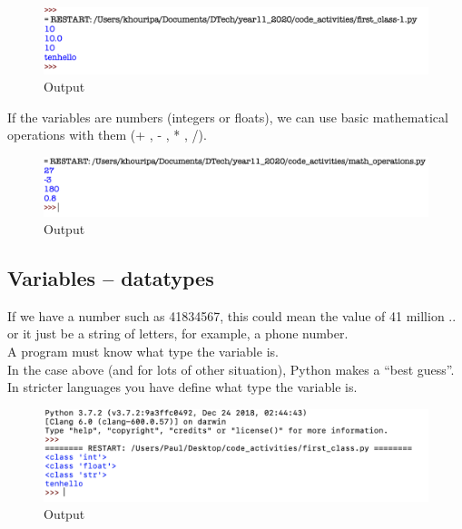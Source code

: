 \documentclass[a4paper,12pt]{article}
\begin{document}
\begin{figure} [!h]
	\centering
	\includegraphics[width=18cm]{screen_shots/first_class-1.png}
	\caption*{Output}
\end{figure}
If the variables are numbers (integers or floats), we can use basic mathematical operations with them (+ , - , * , /).


\begin{figure} [!h]
	\centering
	\includegraphics[width=18cm]{screen_shots/math_operations.png}
	\caption*{Output}
\end{figure}

\subsection{Variables  -- datatypes}
If we have a number such as 41834567, this could mean the value of 41 million .. or it just be a string of letters, for example, a phone number.\\
A program must know what type the variable is.\\
In the case above (and for lots of other situation), Python makes a “best guess”. In stricter languages you have define what type the variable is. \\


\begin{figure} [!h]
	\centering
	\includegraphics[width=18cm]{screen_shots/first_class.png}
	\caption*{Output}
\end{figure}
\end{document}
